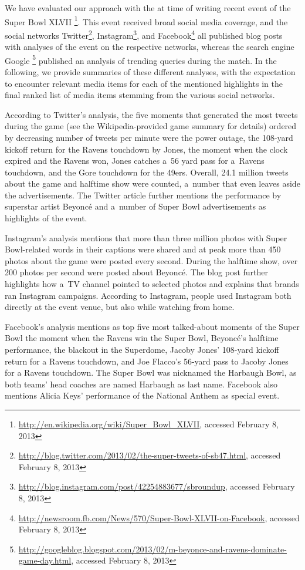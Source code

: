 We have evaluated our approach with the at time of writing
recent event of the Super Bowl XLVII%
\footnote{\url{http://en.wikipedia.org/wiki/Super_Bowl_XLVII},
accessed February 8, 2013}.
This event received broad social media coverage, and the social networks
Twitter\footnote{\url{http://blog.twitter.com/2013/02/the-super-tweets-of-sb47.html},
accessed February 8, 2013},
Instagram\footnote{\url{http://blog.instagram.com/post/42254883677/sbroundup},
accessed February 8, 2013}, and
Facebook\footnote{\url{http://newsroom.fb.com/News/570/Super-Bowl-XLVII-on-Facebook},
accessed February 8, 2013} all published blog posts with analyses of the event
on the respective networks,
whereas the search engine Google%
\footnote{\url{http://googleblog.blogspot.com/2013/02/m-beyonce-and-ravens-dominate-game-day.html},
accessed February 8, 2013}
published an analysis of trending queries during the match.
In the following, we provide summaries of these different analyses,
with the expectation to encounter relevant media items
for each of the mentioned highlights in the final ranked list of media items
stemming from the various social networks.

According to Twitter's analysis, the five moments that generated the most tweets
during the game (see the Wikipedia-provided game summary for details)
ordered by decreasing number of tweets per minute were
the power outage,
the 108-yard kickoff return for the Ravens touchdown by Jones,
the moment when the clock expired and the Ravens won,
Jones catches a~56 yard pass for a~Ravens touchdown,
and the Gore touchdown for the 49ers.
Overall, 24.1 million tweets about the game and halftime show were counted,
a~number that even leaves aside the advertisements.
The Twitter article further mentions the performance by superstar artist Beyoncé 
and a~number of Super Bowl advertisements as highlights of the event.   

Instagram's analysis mentions that more than three million photos
with Super Bowl-related words in their captions were shared and
at peak more than 450 photos about the game were posted every second.
During the halftime show, over 200 photos per second were posted about Beyoncé.
The blog post further highlights how a~TV channel pointed to selected photos
and explains that brands ran Instagram campaigns.
According to Instagram, people used Instagram both directly at the event venue,
but also while watching from home.

Facebook's analysis mentions as top five most talked-about moments of the Super Bowl 
the moment when the Ravens win the Super Bowl, 
Beyoncé's halftime performance,
the blackout in the Superdome,
Jacoby Jones' 108-yard kickoff return for a Ravens touchdown, and
Joe Flacco’s 56-yard pass to Jacoby Jones for a Ravens touchdown.
The Super Bowl was nicknamed the Harbaugh Bowl, as both teams' head coaches
are named Harbaugh as last name.
Facebook also mentions Alicia Keys' performance of the National Anthem as special event.

